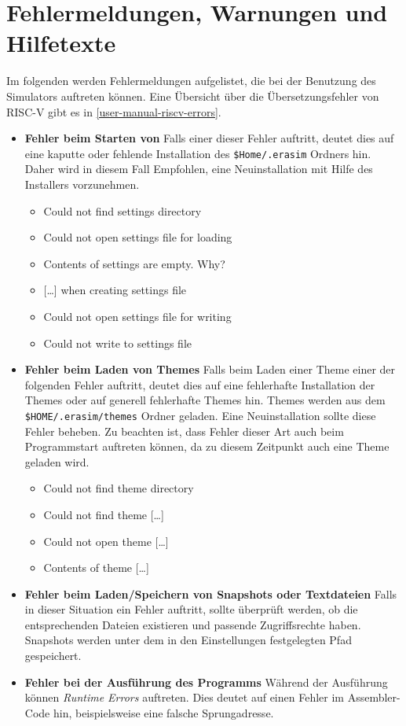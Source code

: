 
\section{Fehlermeldungen, Warnungen und Hilfetexte}

Im folgenden werden Fehlermeldungen aufgelistet, die bei der Benutzung des Simulators auftreten können.
Eine Übersicht über die Übersetzungsfehler von RISC-V gibt es in \autoref{user-manual-riscv-errors}.

\begin{itemize}
    \item \textbf{Fehler beim Starten von \erasim} Falls einer dieser Fehler
    auftritt, deutet dies auf eine kaputte oder fehlende Installation des
    \texttt{\$Home/.erasim} Ordners hin. Daher wird in diesem Fall Empfohlen,
    eine Neuinstallation mit Hilfe des Installers vorzunehmen.
        \begin{itemize}
            \item Could not find settings directory
            \item Could not open settings file for loading
            \item Contents of settings are empty. Why?
            \item {[\dots]} when creating settings file
            \item Could not open settings file for writing
            \item Could not write to settings file
        \end{itemize}
    \item \textbf{Fehler beim Laden von Themes} Falls beim Laden einer Theme
    einer der folgenden Fehler auftritt, deutet dies auf eine fehlerhafte
    Installation der Themes oder auf generell fehlerhafte Themes hin. Themes
    werden aus dem \texttt{\$HOME/.erasim/themes} Ordner geladen. Eine
    Neuinstallation sollte diese Fehler beheben. Zu beachten ist, dass Fehler
    dieser Art auch beim Programmstart auftreten können, da zu diesem Zeitpunkt
    auch eine Theme geladen wird.
        \begin{itemize}
            \item Could not find theme directory
            \item Could not find theme {[\dots]}
            \item Could not open theme {[\dots]}
            \item Contents of theme {[\dots]}
        \end{itemize}
    \item \textbf{Fehler beim Laden/Speichern von Snapshots oder Textdateien}
    Falls in dieser Situation ein Fehler auftritt, sollte überprüft werden, ob
    die entsprechenden Dateien existieren und passende Zugriffsrechte haben.
    Snapshots werden unter dem in den Einstellungen festgelegten Pfad
    gespeichert.
    \item \textbf{Fehler bei der Ausführung des Programms} Während der
    Ausführung können \textit{Runtime Errors} auftreten. Dies deutet auf einen
    Fehler im Assembler-Code hin, beispielsweise eine falsche Sprungadresse.
\end{itemize}

